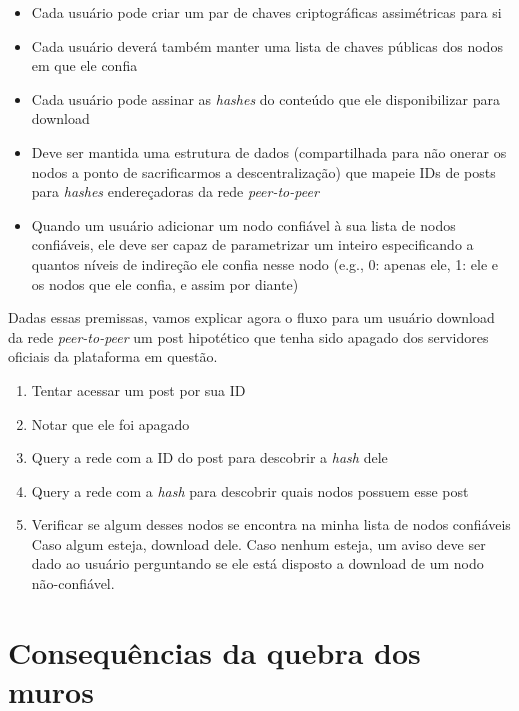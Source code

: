 \begin{itemize}
    \item Cada usuário pode criar um par de chaves criptográficas assimétricas para si
    \item Cada usuário deverá também manter uma lista de chaves públicas dos nodos em que ele confia
    \item Cada usuário pode assinar as \textit{hashes} do conteúdo que ele disponibilizar para download
    \item Deve ser mantida uma estrutura de dados (compartilhada para não onerar os nodos a ponto de sacrificarmos a descentralização) que mapeie IDs de posts para \textit{hashes} endereçadoras da rede \textit{peer-to-peer}
    \item Quando um usuário adicionar um nodo confiável à sua lista de nodos confiáveis, ele deve ser capaz de parametrizar um inteiro especificando a quantos níveis de indireção ele confia nesse nodo (e.g., 0: apenas ele, 1: ele e os nodos que ele confia, e assim por diante)
\end{itemize}

Dadas essas premissas, vamos explicar agora o fluxo para um usuário download da rede \textit{peer-to-peer} um post hipotético que tenha sido apagado dos servidores oficiais da plataforma em questão.

\begin{enumerate}
    \item Tentar acessar um post por sua ID
    \item Notar que ele foi apagado
    \item Query a rede com a ID do post para descobrir a \textit{hash} dele
    \item Query a rede com a \textit{hash} para descobrir quais nodos possuem esse post
    \item Verificar se algum desses nodos se encontra na minha lista de nodos confiáveis
        \subitem Caso algum esteja, download dele.
        \subitem Caso nenhum esteja, um aviso deve ser dado ao usuário perguntando se ele está disposto a download de um nodo não-confiável.
\end{enumerate}

\section{Consequências da quebra dos muros}

